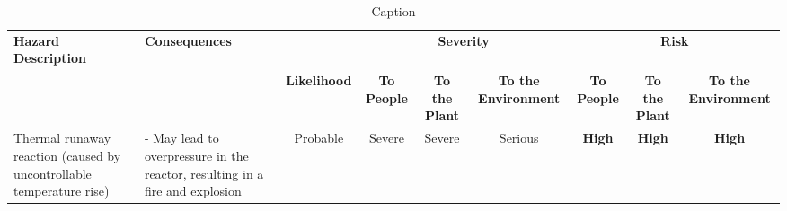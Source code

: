 \begin{table}
    \centering\footnotesize
    \caption{Caption}
    \label{tab:my_label}

\begin{tabularx}{\linewidth}{|p{3cm}|X|c|c|c|c|c|c|c|}

                                                                                                                       \textbf{Hazard Description}  & \textbf{Consequences}                                                                                                                                                                                                                                                                                                                                                                          &                                       & \multicolumn{3}{c|}{\textbf{Severity}}                                                                                                                                                                  & \multicolumn{3}{c|}{\textbf{Risk}}                                                                                                                                                                       \\ \cline{4-9} 
                                                                                     & \multicolumn{1}{c|}{\multirow{-2}{*}{}}                                                                                                                                                                                                                                                                                                                                   & \multirow{-2}{*}{\textbf{Likelihood}} & \textbf{To  People} & \textbf{To the Plant} & \textbf{To the Environment} & \textbf{To  People} & \textbf{To the Plant} & \textbf{To the  Environment}\\
Thermal runaway  reaction  (caused by  uncontrollable  temperature rise) & - May lead to overpressure in the reactor,    resulting in a fire and explosion                                                                                                                                                                                                                                                                      & Probable                              & Severe                                                        & Severe                                                          & Serious                                                               & \cellcolor[HTML]{FD6864}\textbf{High}                         & \cellcolor[HTML]{FD6864}\textbf{High}                           & \cellcolor[HTML]{FD6864}\textbf{High}                                   \\

\end{tabularx}
\end{table}
